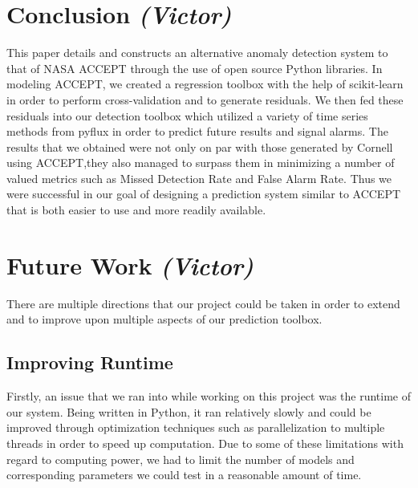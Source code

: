 \documentclass{acm_proc_article-sp}
\begin{document}
\section{Conclusion \textit{(Victor)}}
This paper details and constructs an alternative anomaly detection system to that of NASA ACCEPT through the use of open source Python libraries. In modeling ACCEPT, we created a regression toolbox with the help of scikit-learn in order to perform cross-validation and to generate residuals. We then fed these residuals into our detection toolbox which utilized a variety of time series methods from pyflux in order to predict future results and signal alarms. The results that we obtained were not only on par with those generated by Cornell using ACCEPT,they also managed to surpass them in minimizing a number of valued metrics such as Missed Detection Rate and False Alarm Rate. Thus we were successful in our goal of designing a prediction system similar to ACCEPT that is both easier to use and more readily available.

\section{Future Work \textit{(Victor)}}
There are multiple directions that our project could be taken in order to extend and to improve upon multiple aspects of our prediction toolbox.

\subsection{Improving Runtime}
Firstly, an issue that we ran into while working on this project was the runtime of our system. Being written in Python, it ran relatively slowly and could be improved through optimization techniques such as parallelization to multiple threads in order to speed up computation. Due to some of these limitations with regard to computing power, we had to limit the number of models and corresponding parameters we could test in a reasonable amount of time.
\end{document}

